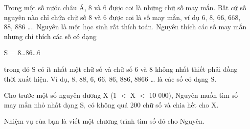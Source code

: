 Trong một số nước châu Á, 8 và 6 được coi là những chữ số may mắn. Bất cứ số nguyên nào chỉ chứa chữ số 8 và 6 được coi là số may mắn, ví dụ 6, 8, 66, 668, 88, 886 …. Nguyên là một học sinh rất thích toán. Nguyên thích các số may mắn nhưng chỉ thích các số có dạng  

   S = 8…86…6  

   trong đó S có ít nhất một chữ số và chữ số 6 và 8 không nhất thiết phải đồng thời xuất hiện. Ví dụ, 8, 88, 6, 66, 86, 886, 8866 … là các số có dạng S.  

   Cho trước một số nguyên dương X (1 $<$ X $<$ 10 000), Nguyên muốn tìm số may mắn nhỏ nhất dạng S, có không quá 200 chữ số và chia hết cho X.  

   Nhiệm vụ của bạn là viết một chương trình tìm số đó cho Nguyên.